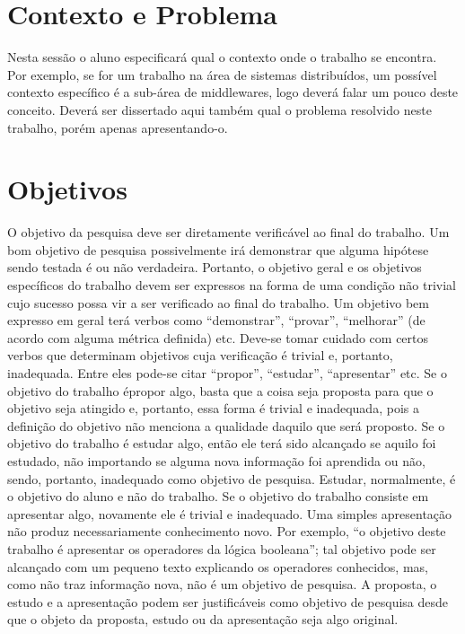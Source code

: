 \documentclass[
	12pt,				%
    oneside,			%
	a4paper,			%
	english,			%
	french,				%
	spanish,			%
	brazil,				%
	]{abntex2}
\begin{document}
\section{Contexto e Problema}

Nesta sessão o aluno especificará qual o contexto onde o trabalho se encontra. Por exemplo, se for um trabalho na área de sistemas distribuídos, um possível contexto específico é a sub-área de middlewares, logo deverá falar um pouco deste conceito. 
Deverá ser dissertado aqui também qual o problema resolvido neste trabalho, porém apenas apresentando-o.


\section{Objetivos}

O objetivo da pesquisa deve ser diretamente verificável ao final do trabalho. Um bom objetivo de pesquisa
possivelmente irá demonstrar que alguma hipótese sendo testada é ou não verdadeira.
Portanto, o objetivo geral e os objetivos específicos do trabalho devem ser expressos na forma de uma
condição não trivial cujo sucesso possa vir a ser verificado ao final do trabalho. Um objetivo bem expresso em
geral terá verbos como “demonstrar”, “provar”, “melhorar” (de acordo com alguma métrica definida) etc.
Deve-se tomar cuidado com certos verbos que determinam objetivos cuja verificação é trivial e, portanto,
inadequada. Entre eles pode-se citar “propor”, “estudar”, “apresentar” etc. Se o objetivo do trabalho épropor
algo, basta que a coisa seja proposta para que o objetivo seja atingido e, portanto, essa forma é trivial e
inadequada, pois a definição do objetivo não menciona a qualidade daquilo que será proposto.
Se o objetivo do trabalho é estudar algo, então ele terá sido alcançado se aquilo foi estudado, não importando
se alguma nova informação foi aprendida ou não, sendo, portanto, inadequado como objetivo de pesquisa.
Estudar, normalmente, é o objetivo do aluno e não do trabalho.
Se o objetivo do trabalho consiste em apresentar algo, novamente ele é trivial e inadequado. Uma simples
apresentação não produz necessariamente conhecimento novo. Por exemplo, “o objetivo deste trabalho é
apresentar os operadores da lógica booleana”; tal objetivo pode ser alcançado com um pequeno texto
explicando os operadores conhecidos, mas, como não traz informação nova, não é um objetivo de pesquisa.
A proposta, o estudo e a apresentação podem ser justificáveis como objetivo de pesquisa desde que o objeto
da proposta, estudo ou da apresentação seja algo original.
\end{document}
